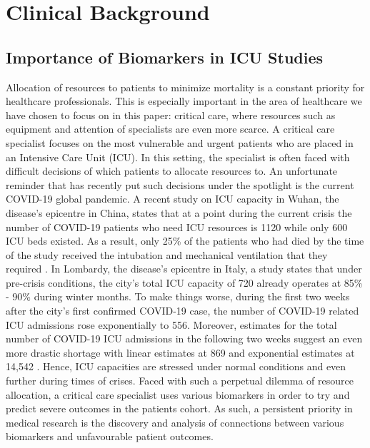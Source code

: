 
\chapter{Clinical Background} %

\label{chapter1} %


\section{Importance of Biomarkers in ICU Studies}

Allocation of resources to patients to minimize mortality is a constant priority for healthcare professionals. This is especially important in the area of healthcare we have chosen to focus on in this paper: critical care,  where resources such as equipment and attention of specialists are even more scarce. A critical care specialist focuses on the most vulnerable and urgent patients who are placed in an Intensive Care Unit (ICU). In this setting, the specialist is often faced with difficult decisions of which patients to allocate resources to. An unfortunate reminder that has recently put such decisions under the spotlight is the current COVID-19 global pandemic. A recent study on ICU capacity in Wuhan, the disease's epicentre in China, states that at a point during the current crisis the number of COVID-19 patients who need ICU resources is 1120 while only 600 ICU beds existed. As a result, only 25\% of the patients who had died by the time of the study received the intubation and mechanical ventilation that they required \citep{wu2020}. In Lombardy, the disease's epicentre in Italy, a study states that under pre-crisis conditions,  the city's  total ICU capacity of 720 already operates at 85\% - 90\% during winter months. To make things worse, during the first two weeks after the city's first confirmed COVID-19 case, the number of COVID-19 related ICU admissions rose exponentially to 556. Moreover, estimates for the total number of COVID-19 ICU admissions in the following two weeks suggest an even more drastic shortage with linear estimates at 869 and exponential estimates at 14,542 \citep{Grasselli2020}. Hence, ICU capacities are stressed under normal conditions and even further during times of crises.  Faced with such a perpetual dilemma of resource allocation, a critical care specialist uses various biomarkers in order to try and predict severe outcomes in the patients cohort. As such, a persistent priority in medical research is the discovery and analysis of connections between various biomarkers and unfavourable patient outcomes. 

